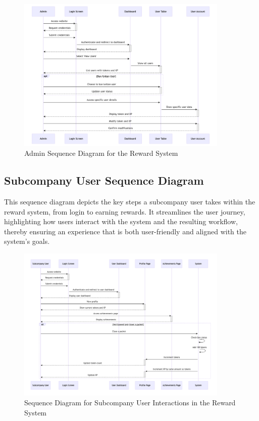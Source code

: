 \begin{figure}[H]
    \centering
    \includegraphics[width=0.9\textwidth]{src/assets/chapters/AdminSequencediagram.png}
    \caption{Admin Sequence Diagram for the Reward System}
    \label{fig:admin_sequence_diagram}
\end{figure}
\subsection{Subcompany User Sequence Diagram}
This sequence diagram depicts the key steps a subcompany user takes within the reward system, from login to earning rewards. It streamlines the user journey, highlighting how users interact with the system and the resulting workflow, thereby ensuring an experience that is both user-friendly and aligned with the system's goals.


\begin{figure}[H]
    \centering
    \includegraphics[width=0.9\textwidth]{src/assets/chapters/subbcomapny_user_sequence_diagram.png}
    \caption{Sequence Diagram for Subcompany User Interactions in the Reward System}
    \label{fig:subcompany_user_sequence_diagram}
\end{figure}

